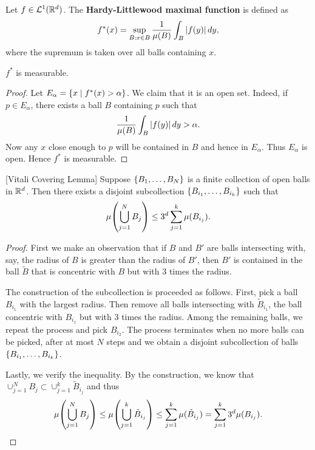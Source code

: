 \begin{definition}
    Let $f\in\mathcal{L}^1(\mathbb{R}^d)$. The \textbf{Hardy-Littlewood maximal function} 
    is defined as 
    \begin{equation*}
        f^*(x) = \sup_{B:x\in B} \frac{1}{\mu(B)}\int_B \left\lvert {f(y)} \right\rvert dy,
    \end{equation*}
    where the supremum is taken over all balls containing $x$.
\end{definition}
\begin{proposition}
    $f^*$ is measurable. 
\end{proposition}
\begin{proof}
    Let $E_\alpha = \left\{ x \;\middle\vert\; f^*(x)>\alpha \right\}$. We claim that it is 
    an open set. Indeed, if $p\in E_\alpha$, there exists a ball 
    $B$ containing $p$ such that 
    \begin{equation*}
        \frac{1}{\mu(B)}\int_B \left\lvert {f(y)} \right\rvert dy > \alpha.
    \end{equation*}
    Now any $x$ close enough to $p$ will be contained in $B$ and 
    hence in $E_\alpha$. Thus $E_\alpha$ is open. Hence $f^*$ is
    measurable.
\end{proof}

\begin{lemma}\label{prop:vitali_cover}[Vitali Covering Lemma]
    Suppose $\left\{ {B_1,\ldots,B_N} \right\}$ is a finite collection of open 
    balls in $\mathbb{R}^d$. Then there exists a disjoint subcollection 
    $\left\{ {B_{i_1},\ldots,B_{i_k}} \right\}$ such that
    \begin{equation*}
        \mu\pth{\bigcup_{j=1}^N B_j} \leq 3^d\sum_{j=1}^k \mu(B_{i_j}).
    \end{equation*}
\end{lemma}
\begin{proof}
    First we make an observation that if $B$ and $B'$ are balls 
    intersecting with, say, the radius of $B$ is greater than 
    the radius of $B'$, then $B'$ is contained in the ball $\tilde{B}$ 
    that is concentric with $B$ but with $3$ times the radius. 

    The construction of the subcollection is proceeded as follows. 
    First, pick a ball $B_{i_1}$ with the largest radius. Then 
    remove all balls intersecting with $\tilde{B}_{i_1}$, the ball 
    concentric with $B_{i_1}$ but with $3$ times the radius. 
    Among the remaining balls, we repeat the process and pick $B_{i_2}$. 
    The process terminates when no more balls can be picked, 
    after at most $N$ steps and we obtain a disjoint subcollection 
    of balls $\left\{ {B_{i_1},\ldots,B_{i_k}} \right\}$. 

    Lastly, we verify the inequality. By the construction, 
    we know that $\cup_{j=1}^N B_j\subset \cup_{j=1}^k\tilde{B}_{i_j}$
    and thus
    \begin{equation*}
        \mu\pth{\bigcup_{j=1}^N B_j} \leq \mu\pth{\bigcup_{j=1}^k\tilde{B}_{i_j}} 
        \leq \sum_{j=1}^{k} \mu(\tilde{B}_{i_j})
        = \sum_{j=1}^{k} 3^d\mu(B_{i_j}).
    \end{equation*}
\end{proof}

